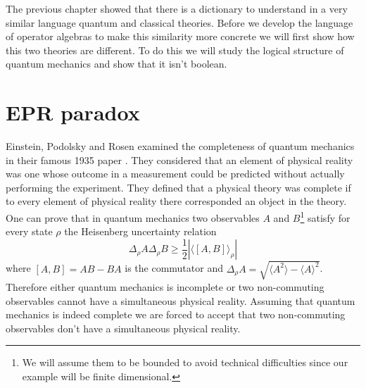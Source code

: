 The previous chapter showed that there is a dictionary to understand in a very similar language quantum and classical theories. Before we develop the language of operator algebras to make this similarity more concrete we will first show how this two theories are different. To do this we will study the logical structure of quantum mechanics and show that it isn't boolean.

\section{EPR paradox}

Einstein, Podolsky and Rosen examined the completeness of quantum mechanics in their famous 1935 paper \cite{Einstein1935}. They considered that an element of physical reality was one whose outcome in a measurement could be predicted without actually performing the experiment. They defined that a physical theory was complete if to every element of physical reality there corresponded an object in the theory. One can prove that in quantum mechanics two observables $A$ and $B$\footnote{We will assume them to be bounded to avoid technical difficulties since our example will be finite dimensional.} satisfy for every state $\rho$ the Heisenberg uncertainty relation
\begin{equation}
\Delta_\rho A\Delta_\rho B\geq\frac{1}{2}|\langle\left[A,B\right]\rangle_\rho|
\end{equation}
where $\left[A,B\right]=AB-BA$ is the commutator and $\Delta_\rho A=\sqrt{\langle A^2\rangle-\langle A\rangle^2}$. Therefore either quantum mechanics is incomplete or two non-commuting observables cannot have a simultaneous physical reality. Assuming that quantum mechanics is indeed complete we are forced to accept that two non-commuting observables don't have a simultaneous physical reality.

